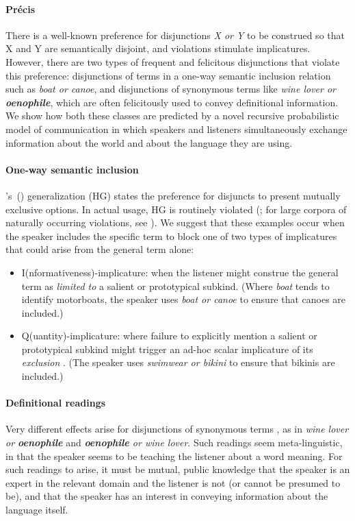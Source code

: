 \documentclass[12pt]{article}
\newcommand{\word}[1]{\emph{#1}}
\newcommand{\posscitet}[1]{\citeauthor{#1}'s~(\citeyear{#1})}
\begin{document}
\paragraph{Pr{\'e}cis}
There is a well-known preference for disjunctions \word{X or Y} to be
construed so that X and Y are semantically disjoint, and violations
stimulate implicatures.  However, there are two types of frequent and
felicitous disjunctions that violate this preference:
disjunctions of terms in a one-way semantic inclusion relation such as
\word{boat or canoe}, and disjunctions of synonymous terms like
\word{wine lover or \textbf{oenophile}}, which are often felicitously
used to convey definitional information.  We show how both these
classes are predicted by a novel recursive probabilistic model of
communication in which speakers and listeners simultaneously exchange
information about the world and about the language they are using.

\paragraph{One-way semantic inclusion}
\posscitet{Hurford:1974} generalization (HG) states the preference for
disjuncts to present mutually exclusive options. In actual usage, HG
is routinely violated (\citealt{Rohdenburg:1985}; for large corpora of
naturally occurring violations, see
\citealt{Potts13MICH,Chemla-HurfordCounts}).  We suggest that these
examples occur when the speaker includes the specific term to block
one of two types of implicatures \citep{levinson:2000} that could arise from the general
term alone:

\begin{itemize}
\item I(nformativeness)-implicature: when the listener might 
  construe the general term as \emph{limited to} a salient or prototypical
  subkind. (Where \word{boat} tends to identify motorboats, the
  speaker uses \emph{boat or canoe} to ensure that
  canoes are included.)

\item Q(uantity)-implicature: where failure to explicitly mention a
  salient or prototypical subkind might trigger an ad-hoc scalar
  implicature of its \emph{exclusion} \citep{hirschberg:1985}. (The
  speaker uses \emph{swimwear or bikini} to ensure that bikinis are
  included.)
\end{itemize}

\paragraph{Definitional readings} Very different effects arise for
disjunctions of synonymous terms \citep{Horn89,Rohdenburg:1985}, as in
\word{wine lover or \textbf{oenophile}} and \word{\textbf{oenophile}
  or wine lover}. Such readings seem meta-linguistic, in that the
speaker seems to be teaching the listener about a word meaning. For
such readings to arise, it must be mutual, public knowledge that the
speaker is an expert in the relevant domain and the listener is not
(or cannot be presumed to be), and that the speaker has an interest in
conveying information about the language itself.
\end{document}
